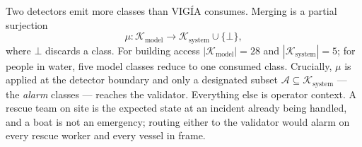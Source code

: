 Two detectors emit more classes than VIGÍA consumes. Merging is a partial
surjection
\begin{equation}
  \mu : \mathcal{K}_{\text{model}} \longrightarrow
        \mathcal{K}_{\text{system}} \cup \{\bot\},
  \label{eq:merge}
\end{equation}
where $\bot$ discards a class. For building access $|\mathcal{K}_{\text{model}}| = 28$
and $|\mathcal{K}_{\text{system}}| = 5$; for people in water, five model classes
reduce to one consumed class. Crucially, $\mu$ is applied at the detector
boundary and only a designated subset
$\mathcal{A} \subseteq \mathcal{K}_{\text{system}}$ — the \emph{alarm} classes
— reaches the validator. Everything else is operator context. A rescue team on
site is the expected state at an incident already being handled, and a boat is
not an emergency; routing either to the validator would alarm on every rescue
worker and every vessel in frame.
